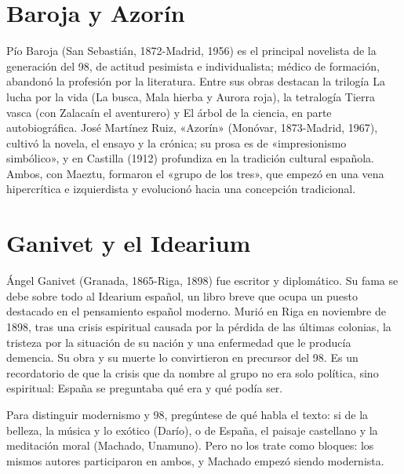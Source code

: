 \documentclass{book}
\begin{document}

\section{Baroja y Azorín}

Pío Baroja (San Sebastián, 1872-Madrid, 1956) es el principal novelista de la generación del 98, de actitud pesimista e individualista; médico de formación, abandonó la profesión por la literatura. Entre sus obras destacan la trilogía La lucha por la vida (La busca, Mala hierba y Aurora roja), la tetralogía Tierra vasca (con Zalacaín el aventurero) y El árbol de la ciencia, en parte autobiográfica. José Martínez Ruiz, «Azorín» (Monóvar, 1873-Madrid, 1967), cultivó la novela, el ensayo y la crónica; su prosa es de «impresionismo simbólico», y en Castilla (1912) profundiza en la tradición cultural española. Ambos, con Maeztu, formaron el «grupo de los tres», que empezó en una vena hipercrítica e izquierdista y evolucionó hacia una concepción tradicional.


\section{Ganivet y el Idearium}

Ángel Ganivet (Granada, 1865-Riga, 1898) fue escritor y diplomático. Su fama se debe sobre todo al Idearium español, un libro breve que ocupa un puesto destacado en el pensamiento español moderno. Murió en Riga en noviembre de 1898, tras una crisis espiritual causada por la pérdida de las últimas colonias, la tristeza por la situación de su nación y una enfermedad que le producía demencia. Su obra y su muerte lo convirtieron en precursor del 98. Es un recordatorio de que la crisis que da nombre al grupo no era solo política, sino espiritual: España se preguntaba qué era y qué podía ser.


\begin{tcolorbox}[title={Consejo}, studiumtip, breakable]

Para distinguir modernismo y 98, pregúntese de qué habla el texto: si de la belleza, la música y lo exótico (Darío), o de España, el paisaje castellano y la meditación moral (Machado, Unamuno). Pero no los trate como bloques: los mismos autores participaron en ambos, y Machado empezó siendo modernista.

\end{tcolorbox}
\end{document}
